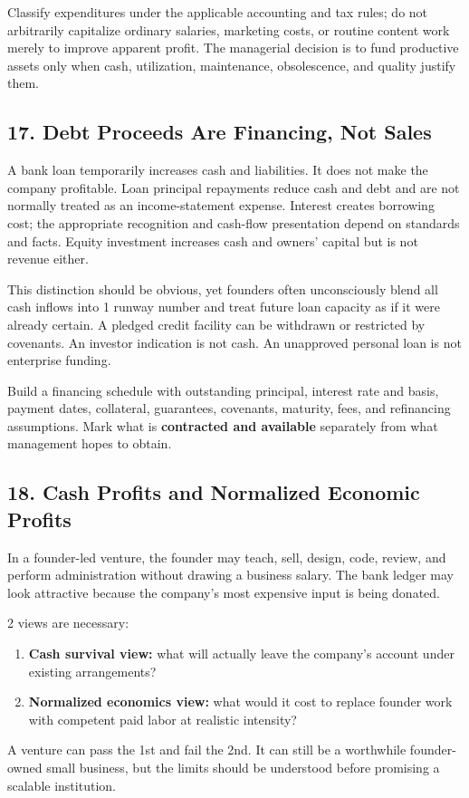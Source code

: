 Classify expenditures under the applicable accounting and tax rules; do not arbitrarily capitalize ordinary salaries, marketing costs, or routine content work merely to improve apparent profit. The managerial decision is to fund productive assets only when cash, utilization, maintenance, obsolescence, and quality justify them.

\subsection*{17. Debt Proceeds Are Financing, Not Sales}

A bank loan temporarily increases cash and liabilities. It does not make the company profitable. Loan principal repayments reduce cash and debt and are not normally treated as an income-statement expense. Interest creates borrowing cost; the appropriate recognition and cash-flow presentation depend on standards and facts. Equity investment increases cash and owners' capital but is not revenue either.

This distinction should be obvious, yet founders often unconsciously blend all cash inflows into 1 runway number and treat future loan capacity as if it were already certain. A pledged credit facility can be withdrawn or restricted by covenants. An investor indication is not cash. An unapproved personal loan is not enterprise funding.

Build a financing schedule with outstanding principal, interest rate and basis, payment dates, collateral, guarantees, covenants, maturity, fees, and refinancing assumptions. Mark what is \textbf{contracted and available} separately from what management hopes to obtain.

\subsection*{18. Cash Profits and Normalized Economic Profits}

In a founder-led venture, the founder may teach, sell, design, code, review, and perform administration without drawing a business salary. The bank ledger may look attractive because the company's most expensive input is being donated.

2 views are necessary:
\begin{enumerate}
\item \textbf{Cash survival view:} what will actually leave the company's account under existing arrangements?
\item \textbf{Normalized economics view:} what would it cost to replace founder work with competent paid labor at realistic intensity?
\end{enumerate}
A venture can pass the 1st and fail the 2nd. It can still be a worthwhile founder-owned small business, but the limits should be understood before promising a scalable institution.

